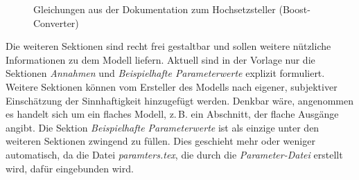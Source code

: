 \begin{figure}[h]
	\centering
	\caption{Gleichungen aus der Dokumentation zum Hochsetzsteller (Boost-Converter)\protect\footnotemark}
	\label{fig:BspDok_ModelEquations}
\end{figure}
%
Die weiteren Sektionen sind recht frei gestaltbar und sollen weitere nützliche Informationen zu dem Modell liefern. Aktuell sind in der Vorlage nur die Sektionen \textit{Annahmen} und \textit{Beispielhafte Parameterwerte} explizit formuliert. Weitere Sektionen können vom Ersteller des Modells nach eigener, subjektiver Einschätzung der Sinnhaftigkeit hinzugefügt werden. Denkbar wäre, angenommen es handelt sich um ein flaches Modell, z.\,B. ein Abschnitt, der flache Ausgänge angibt. Die Sektion \textit{Beispielhafte Parameterwerte} ist als einzige unter den weiteren Sektionen zwingend zu füllen. Dies geschieht mehr oder weniger automatisch, da die Datei \textit{paramters.tex}, die durch die \textit{Parameter-Datei} erstellt wird, dafür eingebunden wird.

